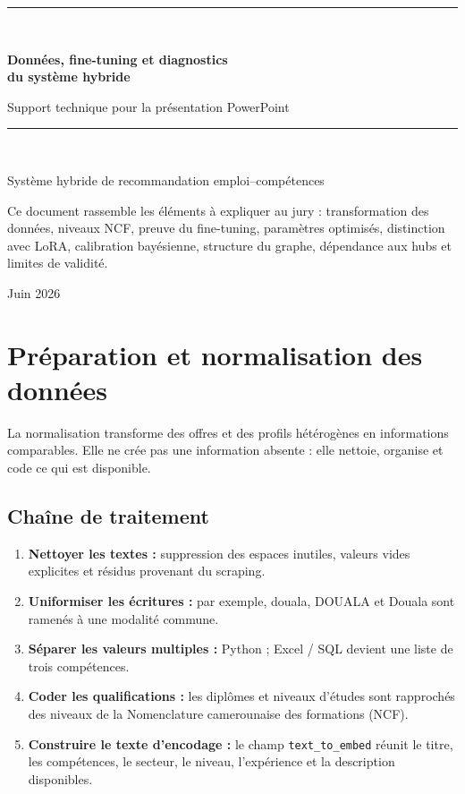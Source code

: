\documentclass[12pt,a4paper]{article}
\begin{document}
\begin{titlepage}
  \centering
  \vspace*{2.2cm}
  {\color{mainblue}\rule{\textwidth}{1.2pt}}\\[0.8cm]
  {\Huge\bfseries Données, fine-tuning et diagnostics\\[0.25cm]
  du système hybride\par}
  \vspace{0.5cm}
  {\Large Support technique pour la présentation PowerPoint\par}
  \vspace{0.8cm}
  {\color{accent}\rule{0.72\textwidth}{0.8pt}}\\[1.2cm]
  {\large Système hybride de recommandation emploi--compétences\par}
  \vfill
  \begin{tcolorbox}[colback=lightblue,colframe=mainblue,arc=2pt,width=0.86\textwidth]
  Ce document rassemble les éléments à expliquer au jury : transformation des données,
  niveaux NCF, preuve du fine-tuning, paramètres optimisés, distinction avec LoRA,
  calibration bayésienne, structure du graphe, dépendance aux hubs et limites de validité.
  \end{tcolorbox}
  \vfill
  {\large Juin 2026}
\end{titlepage}

\tableofcontents
\newpage

\section{Préparation et normalisation des données}

La normalisation transforme des offres et des profils hétérogènes en informations comparables.
Elle ne crée pas une information absente : elle nettoie, organise et code ce qui est disponible.

\subsection{Chaîne de traitement}

\begin{enumerate}
  \item \textbf{Nettoyer les textes :} suppression des espaces inutiles, valeurs vides explicites
  et résidus provenant du scraping.
  \item \textbf{Uniformiser les écritures :} par exemple, \og douala\fg{}, \og DOUALA\fg{}
  et \og Douala \fg{} sont ramenés à une modalité commune.
  \item \textbf{Séparer les valeurs multiples :} \og Python ; Excel / SQL\fg{} devient une
  liste de trois compétences.
  \item \textbf{Coder les qualifications :} les diplômes et niveaux d'études sont rapprochés
  des niveaux de la Nomenclature camerounaise des formations (NCF).
  \item \textbf{Construire le texte d'encodage :} le champ \texttt{text\_to\_embed} réunit
  le titre, les compétences, le secteur, le niveau, l'expérience et la description disponibles.
\end{enumerate}
\end{document}

